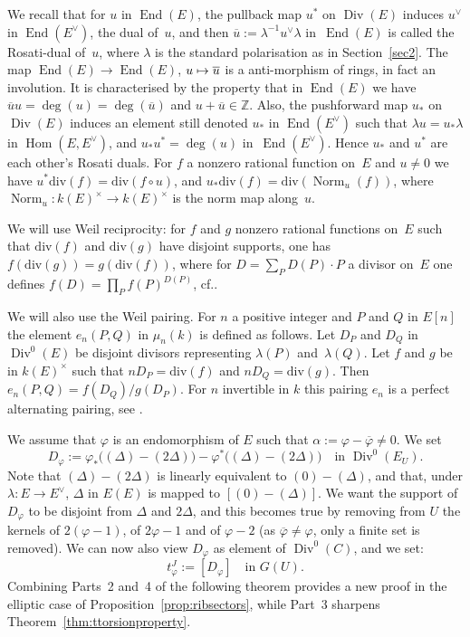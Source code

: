 \documentclass[11pt]{article}
\newcommand{\cf}{cf.\xspace}
\def\mto{\mathchoice{\longmapsto}{\mapsto}{\mapsto}{\mapsto}}
\let\oldvee\vee
\renewcommand{\vee}{{\scriptscriptstyle\oldvee}}
\theoremstyle{plain}
\theoremstyle{definition}
\numberwithin{equation}{subsection}
\let\ol\overline
\let\phi\varphi
\newcommand{\Z}{\mathbb Z}
\newcommand{\divisor}{\mathrm{div}}
\DeclareMathOperator{\Div}{Div}
\DeclareMathOperator{\End}{End}
\DeclareMathOperator{\Hom}{Hom}
\DeclareMathOperator{\Norm}{Norm}
\begin{document}
We recall that for $u$ in $\End(E)$, the pullback map $u^*$ on
$\Div(E)$ induces $u^\vee$ in $\End(E^\vee)$, the dual of~$u$, and
then $\ol{u}:=\lambda^{-1} u^\vee\lambda$ in~$\End(E)$ is called the
Rosati-dual of~$u$, where $\lambda$ is the standard polarisation as in
Section~\ref{sec2}. The map $\End(E)\to\End(E)$, $u\mto \ol{u}$ is
a anti-morphism of rings, in fact an involution. It is characterised
by the property that in $\End(E)$ we have
$\ol{u}u=\deg(u)=\deg(\ol{u})$ and $u+\ol{u}\in\Z$. Also, the
pushforward map $u_*$ on $\Div(E)$ induces an element still denoted
$u_*$ in $\End(E^\vee)$ such that $\lambda u=u_*\lambda$ in $\Hom(E,
E^\vee)$, and $u_*u^*=\deg(u)$ in~$\End(E^\vee)$. Hence $u_*$ and
$u^*$ are each other's Rosati duals. For $f$ a nonzero rational function
on~$E$ and $u\neq 0$ we have $u^*\divisor(f)=\divisor(f\circ u)$, and
$u_*\divisor(f)=\divisor(\Norm_u(f))$, where $\Norm_u\colon
k(E)^\times\to k(E)^\times$ is the norm map along~$u$.

We will use Weil reciprocity: for $f$ and $g$ nonzero rational
functions on~$E$ such that $\divisor(f)$ and $\divisor(g)$ have
disjoint supports, one has $f(\divisor(g))=g(\divisor(f))$, where for
$D=\sum_PD(P){\cdot}P$ a divisor on~$E$ one defines
$f(D)=\prod_Pf(P)^{D(P)}$, \cf \cite[III, Prop.\,7]{Serre}.

We will also use the Weil pairing. For $n$ a positive integer and $P$
and $Q$ in $E[n]$ the element $e_n(P,Q)$ in $\mu_n(k)$ is defined as
follows. Let $D_P$ and $D_Q$ in $\Div^0(E)$ be disjoint divisors
representing $\lambda(P)$ and~$\lambda(Q)$. Let $f$ and $g$ be in
$k(E)^\times$ such that $nD_P=\divisor(f)$ and
$nD_Q=\divisor(g)$. Then $e_n(P,Q)=f(D_Q)/g(D_P)$. For $n$ invertible
in $k$ this pairing $e_n$ is a perfect alternating pairing, see
\cite[Chap.\,12, Rem.\,3.7]{Husemoller}.

We assume that $\phi$ is an endomorphism of $E$ such that
$\alpha:=\phi-\ol{\phi}\neq 0$. We set
\begin{equation}
\label{eq:def_D}
D_\phi := \phi_*\big((\Delta)-(2\Delta)\big) -
\phi^*\big((\Delta)-(2\Delta)\big)
\quad\text{in $\Div^0(E_U)$}.
\end{equation}
Note that $(\Delta)-(2\Delta)$ is linearly equivalent to
$(0)-(\Delta)$, and that, under $\lambda\colon E\to E^\vee$, $\Delta$
in $E(E)$ is mapped to $[(0)-(\Delta)]$.
We want the support of $D_\phi$ to be disjoint from $\Delta$ and
$2\Delta$, and this becomes true by removing from $U$ the kernels of
$2(\phi-1)$, of $2\phi-1$ and of $\phi-2$ (as $\ol{\phi}\neq\phi$,
only a finite set is removed). We can now also view $D_\phi$ as
element of $\Div^0(C)$, and we set:
\begin{equation}
\label{eq:def_sJ}
t^J_\phi := [D_\phi] \quad\text{in $G(U)$.}
\end{equation}
Combining Parts~2 and~4 of the following theorem
provides a new proof in the elliptic case of Proposition~\ref{prop:ribsectors},
while Part~3 sharpens Theorem~\ref{thm:ttorsionproperty}.
\end{document}
